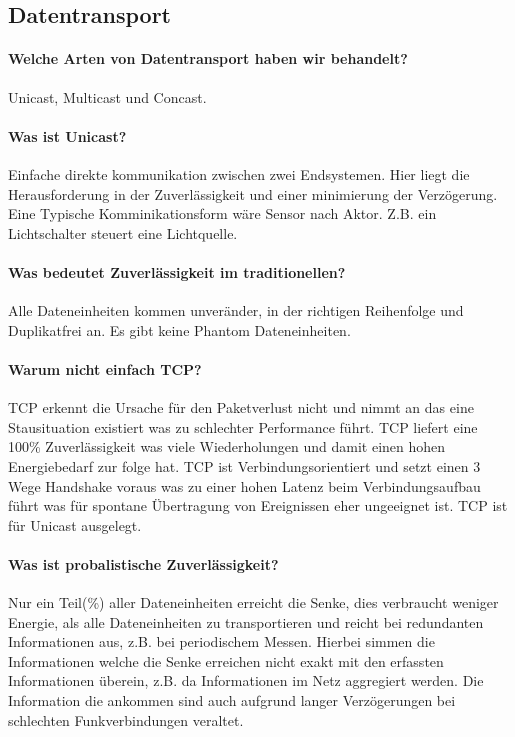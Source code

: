 \subsection{Datentransport}
	\paragraph{Welche Arten von Datentransport haben wir behandelt?}
	Unicast, Multicast und Concast.
	
	\paragraph{Was ist Unicast?}
	Einfache direkte kommunikation zwischen zwei Endsystemen. Hier liegt die Herausforderung in der Zuverlässigkeit und einer minimierung der Verzögerung. Eine Typische Komminikationsform wäre Sensor nach Aktor. Z.B. ein Lichtschalter steuert eine Lichtquelle.
	
	\paragraph{Was bedeutet Zuverlässigkeit im traditionellen?}
	Alle Dateneinheiten kommen unveränder, in der richtigen Reihenfolge und Duplikatfrei an. Es gibt keine Phantom Dateneinheiten.
	
	\paragraph{Warum nicht einfach TCP?}
	TCP erkennt die Ursache für den Paketverlust nicht und nimmt an das eine Stausituation existiert was zu schlechter Performance führt.
	TCP liefert eine 100\% Zuverlässigkeit was viele Wiederholungen und damit einen hohen Energiebedarf zur folge hat. TCP ist Verbindungsorientiert und setzt einen 3 Wege Handshake voraus was zu einer hohen Latenz beim Verbindungsaufbau führt was für spontane Übertragung von Ereignissen eher ungeeignet ist. TCP ist für Unicast ausgelegt.
	
	\paragraph{Was ist probalistische Zuverlässigkeit?}
	Nur ein Teil(\%) aller Dateneinheiten erreicht die Senke, dies verbraucht weniger Energie, als alle Dateneinheiten zu transportieren und reicht bei redundanten Informationen aus, z.B. bei periodischem Messen. Hierbei simmen die Informationen welche die Senke erreichen nicht exakt mit den erfassten Informationen überein, z.B. da Informationen im Netz aggregiert werden. Die Information die ankommen sind auch aufgrund langer Verzögerungen bei schlechten Funkverbindungen veraltet.
	

